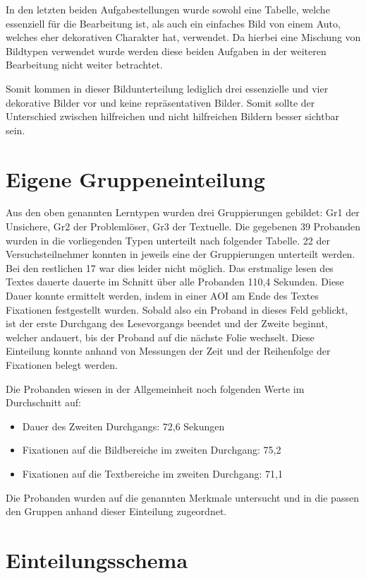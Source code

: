 In den letzten beiden Aufgabestellungen wurde sowohl eine Tabelle, welche essenziell für die Bearbeitung ist, als auch ein einfaches Bild von einem Auto, welches eher dekorativen Charakter hat, verwendet. Da hierbei eine Mischung von Bildtypen verwendet wurde werden diese beiden Aufgaben in der weiteren Bearbeitung nicht weiter betrachtet. 

Somit kommen in dieser Bildunterteilung lediglich drei essenzielle und vier dekorative Bilder vor und keine repräsentativen Bilder. Somit sollte der Unterschied zwischen hilfreichen und nicht hilfreichen Bildern besser sichtbar sein.


\section{Eigene Gruppeneinteilung}

Aus den oben genannten Lerntypen wurden drei Gruppierungen gebildet: \gls{Gr1} der Unsichere, \gls{Gr2} der Problemlöser, \gls{Gr3} der Textuelle. Die gegebenen 39 Probanden wurden in die vorliegenden Typen unterteilt nach folgender Tabelle. 22 der Versuchsteilnehmer konnten in jeweils eine der Gruppierungen unterteilt werden. Bei den restlichen 17 war dies leider nicht möglich. Das erstmalige lesen des Textes dauerte dauerte im Schnitt über alle Probanden 110,4 Sekunden. Diese Dauer konnte ermittelt werden, indem in einer AOI am Ende des Textes Fixationen festgestellt wurden. Sobald also ein Proband in dieses Feld geblickt, ist der erste Durchgang des Lesevorgangs beendet und der Zweite beginnt, welcher andauert, bis der Proband auf die nächste Folie wechselt. Diese Einteilung konnte anhand von Messungen der Zeit und der Reihenfolge der Fixationen belegt werden. 


Die Probanden wiesen in der Allgemeinheit noch folgenden Werte im Durchschnitt auf:
    \begin{itemize}
        \item Dauer des Zweiten Durchgangs: 72,6 Sekungen 
        \item Fixationen auf die Bildbereiche im zweiten Durchgang: 75,2
        \item Fixationen auf die Textbereiche im zweiten Durchgang: 71,1
    \end{itemize}

Die Probanden wurden auf die genannten Merkmale untersucht und in die passen den Gruppen anhand dieser Einteilung zugeordnet.
\section*{Einteilungsschema}

